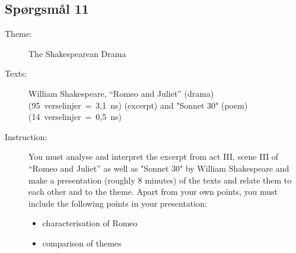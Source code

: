 \documentclass[10pt,a4paper]{article}
\begin{document}
\subsection{Spørgsmål 11}
\begin{description}
\item[Theme:] The Shakespearean Drama
\item[Texts:] William Shakespeare, “Romeo and Juliet” (drama) (95~verselinjer~=~3,1~ns) (excerpt) and "Sonnet 30" (poem) (14~verselinjer~=~0,5~ns)
\item[Instruction:] You must analyse and interpret the excerpt from act III, scene III of “Romeo and Juliet” as well as "Sonnet 30" by William Shakespeare and make a presentation (roughly 8 minutes) of the texts and relate them to each other and to the theme. Apart from your own points, you must include the following points in your presentation:
\begin{itemize}
\item characterisation of Romeo 
\item comparison of themes
\end{itemize}
\end{description}
\end{document}
